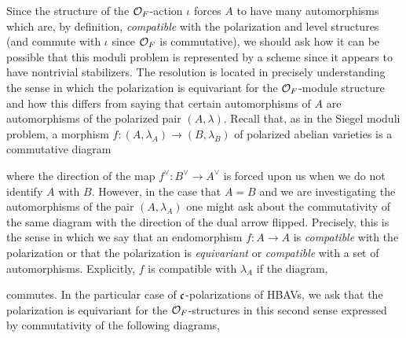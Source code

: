 \documentclass[main.tex]{subfiles}
\begin{document}
\begin{rmk}
Since the structure of the $\mathcal{O}_F$-action $\iota$ forces $A$ to have many automorphisms which are, by definition, \textit{compatible} with the polarization and level structures (and commute with $\iota$ since $\mathcal{O}_F$ is commutative), we should ask how it can be possible that this moduli problem is represented by a scheme since it appears to have nontrivial stabilizers. The resolution is located in precisely understanding the sense in which the polarization is equivariant for the $\mathcal{O}_F$-module structure and how this differs from saying that certain automorphisms of $A$ are automorphisms of the polarized pair $(A, \lambda)$. Recall that, as in the Siegel moduli problem, a morphism $f : (A, \lambda_A) \to (B, \lambda_B)$ of polarized abelian varieties is a commutative diagram
\begin{center}
\end{center}
where the direction of the map $f^{\vee} : B^{\vee} \to A^{\vee}$ is forced upon us when we do not identify $A$ with $B$. However, in the case that $A = B$ and we are investigating the automorphisms of the pair $(A, \lambda_A)$ one might ask about the commutativity of the same diagram with the direction of the dual arrow flipped. Precisely, this is the sense in which we say that an endomorphism $f : A \to A$ is \textit{compatible} with the polarization or that the polarization is \textit{equivariant} or \textit{compatible} with a set of automorphisms. Explicitly, $f$ is compatible with $\lambda_A$ if the diagram, 
\begin{center}
\end{center}
commutes. In the particular case of $\mathfrak{c}$-polarizations of HBAVs, we ask that the polarization is equivariant for the $\mathcal{O}_F$-structures in this second sense expressed by commutativity of the following diagrams,
\begin{center}
\end{center}
\end{rmk}
\end{document}

